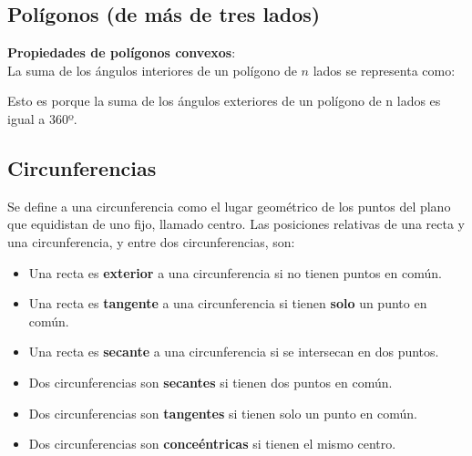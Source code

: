 \documentclass[10pt]{article}
\begin{document}
\subsection{Polígonos (de más de tres lados)}
\textbf{Propiedades de polígonos convexos}:\\
La suma de los ángulos interiores de un polígono de $n$ lados se representa como:
\begin{center}
\end{center}
Esto es porque la suma de los ángulos exteriores de un polígono de n lados es igual a 360º.
\subsection{Circunferencias}
Se define a una circunferencia como el lugar geométrico de los puntos del plano que equidistan de uno fijo, llamado centro. Las posiciones relativas de una recta y una circunferencia, y entre dos circunferencias, son:
\begin{itemize}
\item Una recta es \textbf{exterior} a una circunferencia si no tienen puntos en común.
\item Una recta es \textbf{tangente} a una circunferencia si tienen \textbf{solo} un punto en común.
\item Una recta es \textbf{secante} a una circunferencia si se intersecan en dos puntos.
\item Dos circunferencias son \textbf{secantes} si tienen dos puntos en común.
\item Dos circunferencias son \textbf{tangentes} si tienen solo un punto en común.
\item Dos circunferencias son \textbf{conceéntricas} si tienen el mismo centro.
\end{itemize}
\end{document}

